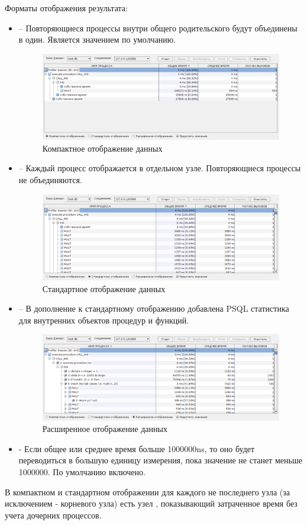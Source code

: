 Форматы отображения результата: 
\begin{itemize}
\item {} -- Повторяющиеся процессы внутри общего родительского будут объединены в один. Является значением по умолчанию.
 \begin{figure}[H]
	\centering
	\includegraphics[width = 0.8\linewidth]{img/profiler_compact_data_display.png}
	\caption{Компактное отображение данных}
\end{figure}
\item {} -- Каждый процесс отображается в отдельном узле. Повторяющиеся процессы не объединяются.
 \begin{figure}[H]
	\centering
	\includegraphics[width = 0.8\linewidth]{img/profiler_standard_data_display.png}
	\caption{Стандартное отображение данных}
\end{figure}
\item {} -- В дополнение к стандартному отображению добавлена PSQL статистика для внутренних объектов процедур и функций.
 \begin{figure}[H]
	\centering
	\includegraphics[width = 0.8\linewidth]{img/profiler_expanded_data_display.png}
	\caption{Расширенное отображение данных}
\end{figure}
\item {} - Если общее или среднее время больше 1000000ns, то оно будет переводиться в большую единицу измерения, пока значение не станет меньше 1000000. По умолчанию включено.
\end{itemize}
В компактном и стандартном отображении для каждого не последнего узла (за исключением  - корневого узла) есть узел , показывающий затраченное время без учета дочерних процессов.

